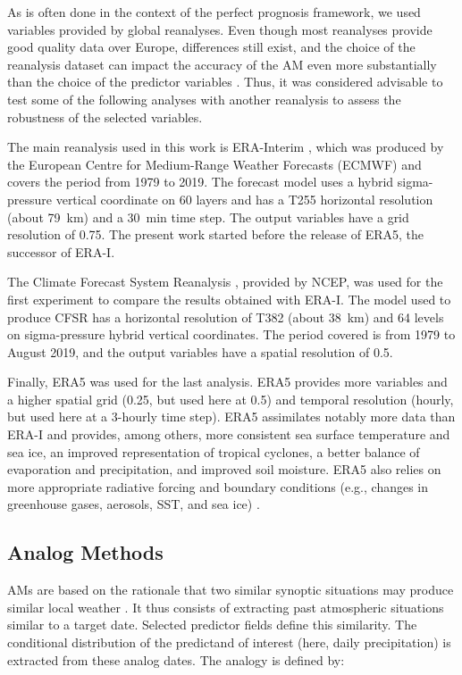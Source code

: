 \documentclass[draft]{agujournal2019}
\begin{document}
As is often done in the context of the perfect prognosis framework, we used variables provided by global reanalyses. Even though most reanalyses provide good quality data over Europe, differences still exist, and the choice of the reanalysis dataset can impact the accuracy of the AM even more substantially than the choice of the predictor variables \cite{Horton2018b}. Thus, it was considered advisable to test some of the following analyses with another reanalysis to assess the robustness of the selected variables.

The main reanalysis used in this work is ERA-Interim \cite<ERA-I,>{Dee2011a}, which was produced by the European Centre for Medium-Range Weather Forecasts (ECMWF) and covers the period from 1979 to 2019. The forecast model uses a hybrid sigma-pressure vertical coordinate on 60 layers and has a T255 horizontal resolution (about 79~km) and a 30~min time step. The output variables have a grid resolution of 0.75\degree. The present work started before the release of ERA5, the successor of ERA-I.

The Climate Forecast System Reanalysis \cite<CFSR,>{Saha2010a}, provided by NCEP, was used for the first experiment to compare the results obtained with ERA-I. The model used to produce CFSR has a horizontal resolution of T382 (about 38~km) and 64 levels on sigma-pressure hybrid vertical coordinates. The period covered is from 1979 to August 2019, and the output variables have a spatial resolution of 0.5\degree.

Finally, ERA5 \cite{Hersbach2019} was used for the last analysis. ERA5 provides more variables and a higher spatial grid (0.25\degree, but used here at 0.5\degree) and temporal resolution (hourly, but used here at a 3-hourly time step). ERA5 assimilates notably more data than ERA-I and provides, among others, more consistent sea surface temperature and sea ice, an improved representation of tropical cyclones, a better balance of evaporation and precipitation, and improved soil moisture. ERA5 also relies on more appropriate radiative forcing and boundary conditions (e.g., changes in greenhouse gases, aerosols, SST, and sea ice) \cite{Hersbach2019}.


\subsection{Analog Methods}
\label{ams}

AMs are based on the rationale that two similar synoptic situations may produce similar local weather \cite{Lorenz1956, Lorenz1969}. It thus consists of extracting past atmospheric situations similar to a target date. Selected predictor fields define this similarity. The conditional distribution of the predictand of interest (here, daily precipitation) is extracted from these analog dates. The analogy is defined by:
\end{document}
